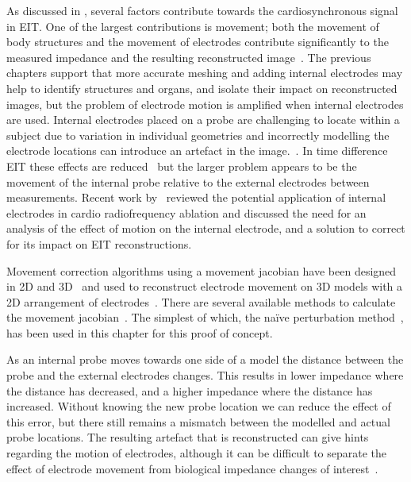 As discussed in , several factors contribute towards
the cardiosynchronous signal in EIT. One of the largest contributions 
is movement; both the movement of 
body structures and the movement of electrodes contribute significantly to the measured
impedance and the resulting reconstructed 
image~\parencite{adler_origins_2017,proenca_influence_2015}.
The previous chapters support that more accurate meshing and adding internal electrodes may
help to identify structures and organs, and isolate their impact on
reconstructed images, but the problem of electrode motion is amplified when internal
electrodes are used. 
Internal electrodes placed on a probe are challenging to locate within a subject
due to variation in individual geometries and incorrectly modelling the electrode 
locations can introduce an artefact in the image.~\parencite{boyle_impact_2011}. 
In time difference EIT these effects are reduced~\parencite{adler_electrical_2017}
but the larger problem appears to be the 
movement of the internal probe relative to the external electrodes between
measurements. Recent work by~
reviewed the potential application of internal electrodes in cardio 
radiofrequency ablation and discussed the need for an analysis 
of the effect of motion on the internal electrode, and a solution 
to correct for its impact on EIT reconstructions.

Movement correction algorithms using a movement jacobian have been 
designed in 2D 
and 3D~\parencite{gomez-laberge_direct_2007,soleimani_imaging_2006,gomez-laberge_direct_2008}
and used to reconstruct electrode movement on 3D models with a 2D arrangement 
of electrodes~\parencite{boyle_geophysical_2016}. 
There are several available methods to calculate the movement 
jacobian~\parencite{boyle_methods_2017}. The simplest of which,
the na\"{i}ve perturbation method~\parencite{gomez-laberge_direct_2008},
has been used in this chapter for this proof of concept.  

As an internal probe moves towards one side of a model the distance between the 
probe and the external electrodes changes. This results in lower 
impedance where the distance 
has decreased, and a higher impedance where the distance has increased. Without knowing 
the new probe location we can reduce the effect of this error, but there still remains 
a mismatch between the modelled and actual probe locations. 
The resulting artefact that is reconstructed can give hints regarding the motion of electrodes,
although it can be difficult to separate the effect of electrode movement 
from biological impedance changes of interest~\parencite{boyle_geophysical_2016}. 

